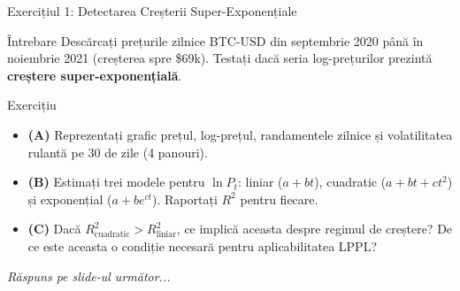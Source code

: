 \documentclass[9pt, aspectratio=169, t]{beamer}
\begin{document}
\begin{frame}{Exercițiul 1: Detectarea Creșterii Super-Exponențiale}
    \begin{cminipage}{0.95\textwidth}
    \begin{alertblock}{Întrebare}
        Descărcați prețurile zilnice BTC-USD din septembrie 2020 până în noiembrie 2021 (creșterea spre \$69k).
        Testați dacă seria log-prețurilor prezintă \textbf{creștere super-exponențială}.
    \end{alertblock}

    \vspace{0.2cm}

    \begin{block}{Exercițiu}
        \begin{itemize}\setlength{\itemsep}{3pt}
            \item \textcolor{MainBlue}{\textbf{(A)}} Reprezentați grafic prețul, log-prețul, randamentele zilnice și volatilitatea rulantă pe 30 de zile (4 panouri).
            \item \textcolor{MainBlue}{\textbf{(B)}} Estimați trei modele pentru $\ln P_t$: liniar ($a + bt$), cuadratic ($a + bt + ct^2$) și exponențial ($a + be^{ct}$). Raportați $R^2$ pentru fiecare.
            \item \textcolor{MainBlue}{\textbf{(C)}} Dacă $R^2_{\text{cuadratic}} > R^2_{\text{liniar}}$, ce implică aceasta despre regimul de creștere? De ce este aceasta o condiție necesară pentru aplicabilitatea LPPL?
        \end{itemize}
    \end{block}

    \vspace{0.2cm}

    \begin{center}
        \textit{Răspuns pe slide-ul următor...}
    \end{center}
    \end{cminipage}
\end{frame}
\end{document}
